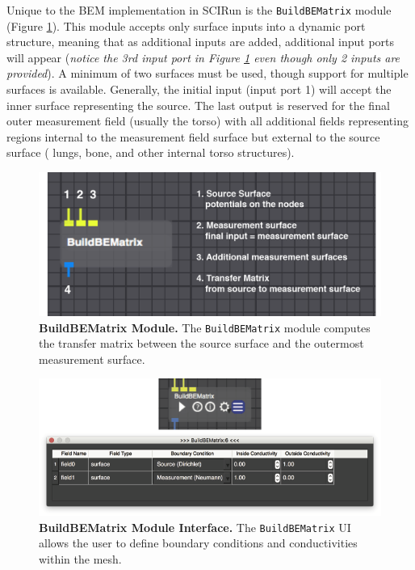 Unique to the BEM implementation in SCIRun is the {\tt BuildBEMatrix} module (Figure \ref{fig:BuildBEModule}). 
This module accepts only surface inputs into a dynamic port structure, meaning that as additional inputs are added, additional input ports will appear ({\em notice the 3rd input port in Figure \ref{fig:BuildBEModule} even though only 2 inputs are provided}). 
A minimum of two surfaces must be used, though support for multiple surfaces is available. 
Generally, the initial input (input port 1) will accept the inner surface representing the source.  
The last output is reserved for the final outer measurement field (usually the torso) with all additional fields representing regions internal to the measurement field surface but external to the source surface (\eg{} lungs, bone, and other internal torso structures).

\begin{figure}[H]
\begin{center}
\includegraphics[width=.8\textwidth]{ECGToolkitGuide_figures/BEMmod.png}
\caption{{\bf BuildBEMatrix Module.} The {\tt BuildBEMatrix} module computes the transfer matrix between 
the source surface and the outermost measurement surface.}
\label{fig:BuildBEModule}
\end{center}
\end{figure}

\newpage 

\begin{figure}[t]
\begin{center}
\includegraphics[width=\textwidth]{ECGToolkitGuide_figures/BuildBEUI_combined.png}
\caption{{\bf BuildBEMatrix Module Interface.} The {\tt BuildBEMatrix} UI allows the user to define boundary 
conditions and conductivities within the mesh. }
\label{fig:BEM_UI}
\end{center}
\end{figure}

